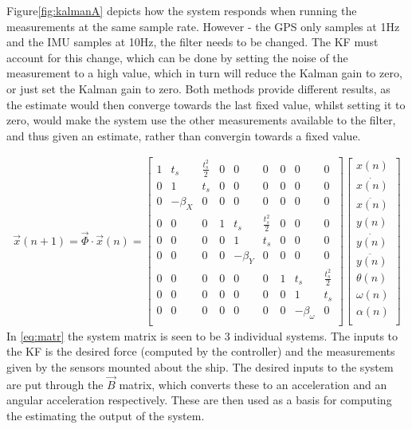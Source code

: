 Figure\vref{fig:kalmanA} depicts how the system responds when running the measurements at the same sample rate. However - the \ac{GPS} only samples at 1Hz and the \ac{IMU} samples at 10Hz, the filter needs to be changed. The \ac{KF} must account for this change, which can be done by setting the noise of the measurement to a high value, which in turn will reduce the Kalman gain  to zero, or just set the Kalman gain to zero. Both methods provide different results, as the estimate would then converge towards the last fixed value, whilst setting it to zero, would make the system use the other measurements available to the filter, and thus given an estimate, rather than convergin towards a fixed value. 	

\begin{align}
\vec{x}(n+1) = \vec{\Phi}\cdot\vec{x}(n) = \begin{bmatrix}
1 & t_s & \frac{t_s^2}{2} & 0 & 0 & 0 & 0 & 0 & 0\\
0 & 1 & t_s & 0 & 0 & 0 & 0 & 0 & 0\\
0 & -\beta_X & 0 & 0 & 0 & 0 & 0 & 0 & 0\\
0 & 0 & 0 & 1 & t_s & \frac{t_s^2}{2} & 0 & 0 & 0\\
0 & 0 & 0 & 0 & 1 & t_s & 0 & 0 & 0\\
0 & 0 & 0 & 0 & -\beta_Y & 0 & 0 & 0 & 0\\
0 & 0 & 0 & 0 & 0 & 0 & 1 & t_s & \frac{t_s^2}{2}\\
0 & 0 & 0 & 0 & 0 & 0 & 0 & 1 & t_s\\
0 & 0 & 0 & 0 & 0 & 0 & 0 & -\beta_\omega & 0\\
\end{bmatrix}\begin{bmatrix}
x(n)\\
\dot{x(n)}\\
\ddot{x(n)}\\
y(n)\\
\dot{y(n)}\\
\ddot{y(n)}\\
\theta(n)\\
\omega(n)\\
\alpha(n)\\
\end{bmatrix}
\label{eq:matr}
\end{align}
In \vref{eq:matr} the system matrix is seen to be 3 individual systems. The inputs to the \ac{KF} is the desired force (computed by the controller) and the measurements given by the sensors mounted about the ship. The desired inputs to the system are put through the $\vec{B}$ matrix, which converts these to an acceleration and an angular acceleration respectively. These are then used as a basis for computing the estimating the output of the system. 

